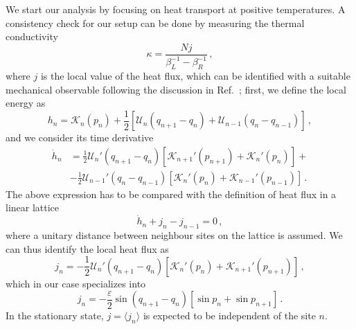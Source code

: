 \documentclass[iop, twocolumns, amssymb,notitlepage]{revtex4-1}
\newcommand{\indice}{n}
\begin{document}
 
We start our analysis by focusing on heat transport at positive temperatures.
A consistency check for our setup can be done by measuring the thermal conductivity
 \begin{equation}
\label{eq:kappa}
 \kappa = \frac{Nj}{\beta_L^{-1}-\beta_R^{-1}}\,,
\end{equation} 
where $j$ is the local value of the heat flux, which can be identified with a suitable mechanical observable
 following the discussion in Ref.~\cite{lepri03}; first, we define the local 
energy as 
 \begin{equation}
  h_\indice=\mathcal{K}_\indice(p_\indice)+\frac{1}{2}\left[ \mathcal{U}_{\indice}(q_{\indice+1}-q_\indice)+\mathcal{U}_{\indice-1}(q_\indice-q_{\indice-1})\right]\,,
 \end{equation}
 and we consider its time derivative
\begin{equation}
\begin{aligned}
 \dot{h}_\indice&=\frac{1}{2}\mathcal{U}_{\indice}'(q_{\indice+1}-q_\indice)[\mathcal{K}_{\indice+1}'(p_{\indice+1})+\mathcal{K}_{\indice}'(p_{\indice})]+\\
 &-\frac{1}{2}\mathcal{U}_{\indice-1}'(q_{\indice}-q_{\indice-1})[\mathcal{K}_{\indice}'(p_{\indice})+\mathcal{K}_{\indice-1}'(p_{\indice-1})]\,.
 \end{aligned}
\end{equation}
The above expression has to be compared with the definition of heat flux in a 
linear lattice
\begin{equation}
 \dot{h}_\indice+j_{\indice}-j_{\indice-1}=0\,,
\end{equation}
where a unitary distance between neighbour sites on the lattice is assumed.
 We can thus identify the local heat flux as
\begin{equation}
\label{eq:heatflux}
 j_\indice=-\frac{1}{2}\mathcal{U}_\indice'(q_{\indice+1}-q_\indice)[\mathcal{K}_{\indice}'(p_{\indice}) + \mathcal{K}_{\indice+1}'(p_{\indice+1})]\,,
\end{equation} 
which in our case specializes into
\begin{equation}
\label{eq:jham}
 j_\indice=-\frac{\varepsilon}{2}\sin(q_{\indice+1}-q_\indice)[\sin p_{\indice} + \sin p_{\indice+1} ]\,.
\end{equation}
In the stationary state, $j=\langle 
j_\indice \rangle$ is expected to be independent of the site $\indice$. 
\end{document}
